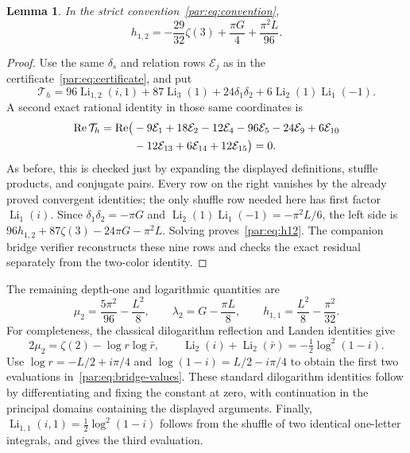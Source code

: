 \documentclass[11pt,a4paper]{article}
\numberwithin{equation}{section}
\newtheorem{lemma}[theorem]{Lemma}
\theoremstyle{definition}
\theoremstyle{remark}
\DeclareMathOperator{\Li}{Li}
\begin{document}
\begin{lemma}\label{par:lem:h12}
In the strict convention~\eqref{par:eq:convention},
\begin{equation}\label{par:eq:h12}
 h_{1,2}=-\frac{29}{32}\zeta(3)+\frac{\pi G}{4}
                         +\frac{\pi^2L}{96}.
\end{equation}
\end{lemma}
\begin{proof}
Use the same $\delta_s$ and relation rows $\mathcal E_j$ as in
the certificate~\eqref{par:eq:certificate}, and put
\[
 \mathcal T_h=96\Li_{1,2}(i,1)+87\Li_3(1)
                +24\delta_1\delta_2+6\Li_2(1)\Li_1(-1).
\]
A second exact rational identity in those same coordinates is
\begin{align}\label{par:eq:h12-certificate}
 \operatorname{Re}\mathcal T_h
 =\operatorname{Re}\bigl(&-9\mathcal E_1+18\mathcal E_2
 -12\mathcal E_4-96\mathcal E_5-24\mathcal E_9
 +6\mathcal E_{10}\notag\\
 &-12\mathcal E_{13}+6\mathcal E_{14}+12\mathcal E_{15}\bigr)=0.
\end{align}
As before, this is checked just by expanding the displayed definitions,
stuffle products, and conjugate pairs. Every row on the right vanishes
by the already proved convergent identities; the only shuffle row
needed here has first factor $\Li_1(i)$.
Since $\delta_1\delta_2=-\pi G$ and
$\Li_2(1)\Li_1(-1)=-\pi^2L/6$, the left side is
$96h_{1,2}+87\zeta(3)-24\pi G-\pi^2L$.
Solving proves~\eqref{par:eq:h12}. The companion bridge verifier
reconstructs these nine rows and checks the exact residual separately
from the two-color identity.
\end{proof}

The remaining depth-one and logarithmic quantities are
\begin{equation}\label{par:eq:bridge-values}
 \mu_2=\frac{5\pi^2}{96}-\frac{L^2}{8},\qquad
 \lambda_2=G-\frac{\pi L}{8},\qquad
 h_{1,1}=\frac{L^2}{8}-\frac{\pi^2}{32}.
\end{equation}
For completeness, the classical dilogarithm reflection and Landen
identities \cite{okudaueno} give
\[
 2\mu_2=\zeta(2)-\log r\log\bar r,
 \qquad
 \Li_2(i)+\Li_2(\bar r)=-\tfrac12\log^2(1-i).
\]
Use $\log r=-L/2+i\pi/4$ and $\log(1-i)=L/2-i\pi/4$
to obtain the first two evaluations in~\eqref{par:eq:bridge-values}.
These standard dilogarithm identities follow by differentiating and
fixing the constant at zero, with continuation in the principal domains
containing the displayed arguments. Finally,
$\Li_{1,1}(i,1)=\tfrac12\log^2(1-i)$ follows from the shuffle of
two identical one-letter integrals, and gives the third evaluation.
\end{document}
